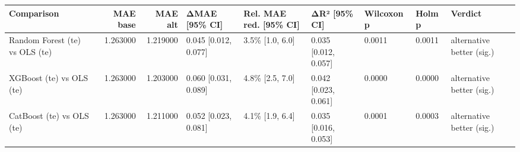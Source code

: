 \begin{tabular}{lrrllllll}
\toprule
Comparison & MAE base & MAE alt & ΔMAE [95\% CI] & Rel. MAE red. [95\% CI] & ΔR² [95\% CI] & Wilcoxon p & Holm p & Verdict \\
\midrule
Random Forest (te) vs OLS (te) & 1.263000 & 1.219000 & 0.045 [0.012, 0.077] & 3.5\% [1.0, 6.0] & 0.035 [0.012, 0.057] & 0.0011 & 0.0011 & alternative better (sig.) \\
XGBoost (te) vs OLS (te) & 1.263000 & 1.203000 & 0.060 [0.031, 0.089] & 4.8\% [2.5, 7.0] & 0.042 [0.023, 0.061] & 0.0000 & 0.0000 & alternative better (sig.) \\
CatBoost (te) vs OLS (te) & 1.263000 & 1.211000 & 0.052 [0.023, 0.081] & 4.1\% [1.9, 6.4] & 0.035 [0.016, 0.053] & 0.0001 & 0.0003 & alternative better (sig.) \\
\bottomrule
\end{tabular}
